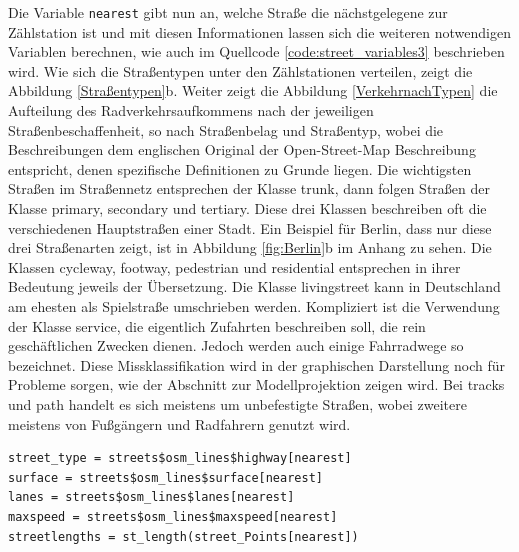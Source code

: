 \documentclass[a4paper,12pt]{thesis}
\begin{document}
Die Variable \lstinline|nearest| gibt nun an, welche Straße die nächstgelegene zur Zählstation ist und mit diesen Informationen lassen sich die weiteren notwendigen Variablen berechnen, wie auch im Quellcode \ref{code:street_variables3} beschrieben wird. Wie sich die Straßentypen unter den Zählstationen verteilen, zeigt die Abbildung \ref{Straßentypen}b. Weiter zeigt die Abbildung \ref{VerkehrnachTypen} die Aufteilung des Radverkehrsaufkommens nach der jeweiligen Straßenbeschaffenheit, so nach Straßenbelag und Straßentyp, wobei die Beschreibungen dem englischen Original der Open-Street-Map Beschreibung entspricht, denen spezifische Definitionen zu Grunde liegen. Die wichtigsten Straßen im Straßennetz entsprechen der Klasse \glqq{}trunk\grqq{}, dann folgen Straßen der Klasse \glqq{}primary\grqq{}, \glqq{}secondary\grqq{} und \glqq{}tertiary\grqq{}. Diese drei Klassen beschreiben oft die verschiedenen Hauptstraßen einer Stadt. Ein Beispiel für Berlin, dass nur diese drei Straßenarten zeigt, ist in Abbildung \ref{fig:Berlin}b im Anhang zu sehen. Die Klassen \glqq{}cycleway\grqq{}, \glqq{}footway\grqq{}, \glqq{}pedestrian\grqq{} und \glqq{}residential\grqq{} entsprechen in ihrer Bedeutung jeweils der Übersetzung. Die Klasse \glqq{}livingstreet\grqq{} kann in Deutschland am ehesten als Spielstraße umschrieben werden. Kompliziert ist die Verwendung der Klasse \glqq{}service\grqq{}, die eigentlich Zufahrten beschreiben soll, die rein geschäftlichen Zwecken dienen. Jedoch werden auch einige Fahrradwege so bezeichnet. Diese Missklassifikation wird in der graphischen Darstellung noch für Probleme sorgen, wie der Abschnitt zur Modellprojektion zeigen wird. Bei \glqq{}tracks\grqq{} und \glqq{}path\grqq{} handelt es sich meistens um unbefestigte Straßen, wobei zweitere meistens von Fußgängern und Radfahrern genutzt wird.

\begin{minipage}{\linewidth}
\begin{lstlisting}[caption={Berechnung der Straßenvariablen},label=code:street_variables3]
street_type = streets$osm_lines$highway[nearest]
surface = streets$osm_lines$surface[nearest]
lanes = streets$osm_lines$lanes[nearest]
maxspeed = streets$osm_lines$maxspeed[nearest]
streetlengths = st_length(street_Points[nearest])
\end{lstlisting}
\end{minipage}
\end{document}
